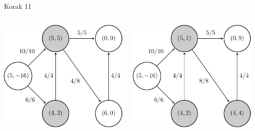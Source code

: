 \documentclass{beamer}
\begin{document}
\begin{frame}{Korak 11}
    \begin{columns}
        \begin{column}{0.5\textwidth}
            \centering
            \includegraphics[scale=0.7]{../writing/images/graf2-13.pdf}
        \end{column}

        \begin{column}{0.5\textwidth}
            \centering
            \includegraphics[scale=0.7]{../writing/images/graf2-12.pdf}
        \end{column}
    \end{columns}
\end{frame}
\end{document}
